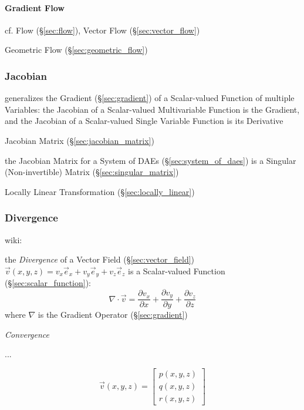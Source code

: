 \paragraph{Gradient Flow}\label{sec:gradient_flow}\hfill

cf. Flow (\S\ref{sec:flow}), Vector Flow (\S\ref{sec:vector_flow})

Geometric Flow (\S\ref{sec:geometric_flow})



\subsubsection{Jacobian}\label{sec:jacobian}


generalizes the Gradient (\S\ref{sec:gradient}) of a Scalar-valued Function of
multiple Variables: the Jacobian of a Scalar-valued Multivariable Function is
the Gradient, and the Jacobian of a Scalar-valued Single Variable Function is
its Derivative

Jacobian Matrix (\S\ref{sec:jacobian_matrix})

\fist the Jacobian Matrix for a System of DAEs (\S\ref{sec:system_of_daes}) is
a Singular (Non-invertible) Matrix (\S\ref{sec:singular_matrix})

\fist Locally Linear Transformation (\S\ref{sec:locally_linear})



\subsubsection{Divergence}\label{sec:divergence}

wiki:

the \emph{Divergence} of a Vector Field (\S\ref{sec:vector_field})
$\vec{v}(x,y,z) = v_x\vec{e}_x + v_y\vec{e}_y + v_z\vec{e}_z$ is a
Scalar-valued Function (\S\ref{sec:scalar_function}):
\[
  \nabla \cdot \vec{v} =
    \frac{\partial v_x}{\partial x} +
    \frac{\partial v_y}{\partial y} +
    \frac{\partial v_z}{\partial z}
\]
where $\nabla$ is the Gradient Operator (\S\ref{sec:gradient})

\emph{Convergence}

...

\[
  \vec{v}(x,y,z) = \begin{bmatrix}
    p(x,y,z) \\
    q(x,y,z) \\
    r(x,y,z)
  \end{bmatrix}
\]


